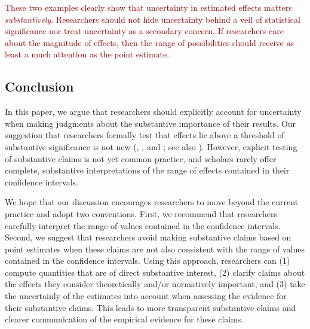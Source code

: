 \documentclass[12pt]{article}
\newcommand{\kelly}[1]{\textcolor{darkred}{#1}}
\begin{document}
\kelly{These two examples clearly show that uncertainty in estimated effects matters \textit{substantively}. Researchers should not hide uncertainty behind a veil of statistical significance nor treat uncertainty as a secondary concern. If researchers care about the magnitude of effects, then the range of possibilities should receive as least a much attention as the point estimate.}

\subsection*{Conclusion}

In this paper, we argue that researchers should explicitly account for uncertainty when making judgments about the substantive importance of their results. Our suggestion that researchers formally test that effects lie above a threshold of substantive significance is not new (\citealt{Achen1982}, \citealt{Rainey2014a}, and \citealt{Gross2014}; see also \citealt{EsareyDanneman2014}). However, explicit testing of substantive claims is not yet common practice, and scholars rarely offer complete, substantive interpretations of the range of effects contained in their confidence intervals. 

We hope that our discussion encourages researchers to move beyond the current practice and adopt two conventions. First, we recommend that researchers carefully interpret the range of values contained in the confidence intervals. Second, we suggest that researchers avoid making substantive claims based on point estimates when these claims are not also consistent with the range of values contained in the confidence intervals. Using this approach, researchers can (1) compute quantities that are of direct substantive interest, (2) clarify claims about the effects they consider theoretically and/or normatively important, and (3) take the uncertainly of the estimates into account when assessing the evidence for their substantive claims. This leads to more transparent substantive claims and clearer communication of the empirical evidence for these claims.


\singlespace


%
\end{document}
